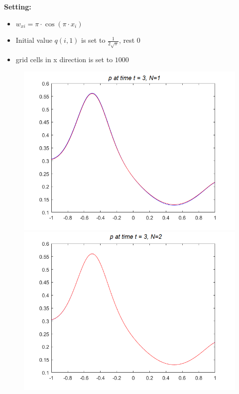 \begin{frame}
	\scriptsize
	\textbf{Setting:}\\
	\begin{itemize}
		\item $w_{xi} = \pi \cdot \cos(\pi\cdot x_i)$
		\item Initial value $q(i,1)$ is set to $\frac{1}{2\sqrt{\pi}}$, rest $0$
		\item grid cells in x direction is set to $1000$
	\end{itemize}
	\begin{figure}[H]
		\centering
		\begin{minipage}{0.32\textwidth}
			\includegraphics[width=\textwidth]{Bilder_wx/Wavepropa/red=12th_blue=2nd_wx=sin(pix)_Awp=0.5sqrt(pi)}
		\end{minipage}
		\hfill
		\begin{minipage}{0.32\textwidth}
			\includegraphics[width=\textwidth]{Bilder_wx/Wavepropa/red=12th_blue=4th_wx=sin(pix)_Awp=0.5sqrt(pi)}

\end{minipage}
\end{figure}
\end{frame}
